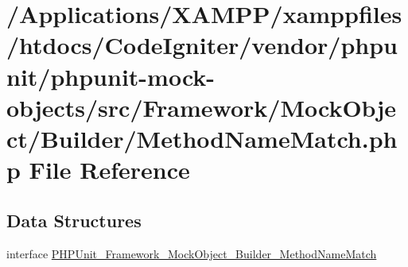 \hypertarget{_method_name_match_8php}{}\section{/\+Applications/\+X\+A\+M\+P\+P/xamppfiles/htdocs/\+Code\+Igniter/vendor/phpunit/phpunit-\/mock-\/objects/src/\+Framework/\+Mock\+Object/\+Builder/\+Method\+Name\+Match.php File Reference}
\label{_method_name_match_8php}
\subsection*{Data Structures}
\begin{DoxyCompactItemize}
\item 
interface \mbox{\hyperlink{interface_p_h_p_unit___framework___mock_object___builder___method_name_match}{P\+H\+P\+Unit\+\_\+\+Framework\+\_\+\+Mock\+Object\+\_\+\+Builder\+\_\+\+Method\+Name\+Match}}
\end{DoxyCompactItemize}
